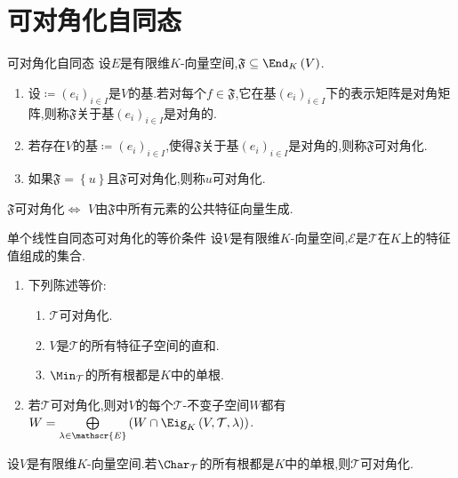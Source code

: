 \section{可对角化自同态}

\begin{definition}{可对角化自同态}{}
	设$E$是有限维$K$-向量空间,$\mathfrak{F}\subseteq\End_{K}\left(V\right)$.
	\begin{enumerate}
		\item 设$\coloneq\left(e_{i}\right)_{i\in I}$是$V$的基.若对每个$f\in\mathfrak{F}$,它在基$\left(e_{i}\right)_{i\in I}$下的表示矩阵是对角矩阵,则称$\mathfrak{F}$关于基$\left(e_{i}\right)_{i\in I}$是对角的.
		\item 若存在$V$的基$\coloneq\left(e_{i}\right)_{i\in I}$,使得$\mathfrak{F}$关于基$\left(e_{i}\right)_{i\in I}$是对角的,则称$\mathfrak{F}$可对角化.
		\item 如果$\mathfrak{F}=\left\{u\right\}$且$\mathfrak{F}$可对角化,则称$u$可对角化.
	\end{enumerate}
\end{definition}

\begin{remark}{}{}
	$\mathfrak{F}$可对角化$\iff$ $V$由$\mathfrak{F}$中所有元素的公共特征向量生成.
\end{remark}

\begin{proposition}{单个线性自同态可对角化的等价条件}{}
	设$V$是有限维$K$-向量空间,$\mathscr{E}$是$\mathcal{T}$在$K$上的特征值组成的集合.
	\begin{enumerate}
		\item 下列陈述等价:
		\begin{enumerate}
			\item $\mathcal{T}$可对角化.
			\item $V$是$\mathcal{T}$的所有特征子空间的直和.
			\item $\Min_{\mathcal{T}}$的所有根都是$K$中的单根.
		\end{enumerate}
		\item 若$\mathcal{T}$可对角化,则对$V$的每个$\mathcal{T}$-不变子空间$W$都有$W=\bigoplus\limits_{\lambda\in\mathscr{E}}\left(W\cap\Eig_{K}\left(V,\mathcal{T},\lambda\right)\right)$.
	\end{enumerate}
\end{proposition}

\begin{corollary}{}{}
	设$V$是有限维$K$-向量空间.若$\Char_{\mathcal{T}}$的所有根都是$K$中的单根,则$\mathcal{T}$可对角化.
\end{corollary}

